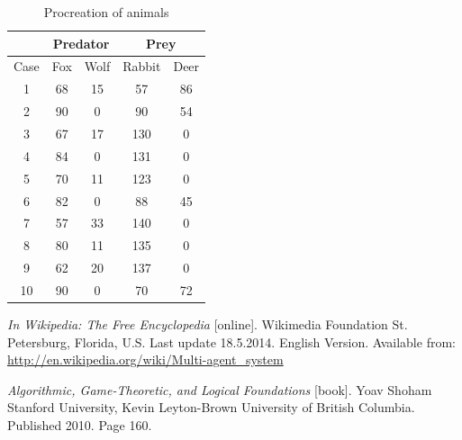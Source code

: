 \documentclass[11pt]{article}
\begin{document}
{	
	
	\begin{table}[p]
	\centering
	\begin{tabular}{| c | c | c || c | c |}
	\hline
	&\multicolumn{2}{|c||}{Predator} & \multicolumn{2}{c|}{Prey} \\
	\hline
	Case & Fox & Wolf & Rabbit & Deer \\
	\hline
	1 & 68 & 15 & 57 & 86 \\
	\hline
	2 & 90 & 0 & 90 & 54 \\
	\hline
	3 & 67 & 17 & 130 & 0 \\
	\hline
	4 & 84 & 0 & 131 & 0 \\
	\hline
	5 & 70 & 11 & 123 & 0 \\
	\hline
	6 & 82 & 0 & 88 & 45 \\
	\hline
	7 & 57 & 33 & 140 & 0 \\
	\hline
	8 & 80 & 11 & 135 & 0 \\
	\hline
	9 & 62 & 20 & 137 & 0 \\
	\hline
	10 & 90 & 0 & 70 & 72 \\
	\hline
	\end{tabular}
	\caption{Procreation of animals}
	\label{tab:procreationTable}
	
	\end{table}
}
\newpage

\begin{thebibliography}{9}

\emph{In Wikipedia: The Free Encyclopedia} [online]. Wikimedia Foundation St. Petersburg, Florida, U.S. Last update 18.5.2014. English Version. Available from: \url{http://en.wikipedia.org/wiki/Multi-agent_system}

\emph{Algorithmic, Game-Theoretic,
and Logical Foundations} [book]. Yoav Shoham Stanford University, Kevin Leyton-Brown University of British Columbia. Published 2010. Page 160. 

\end{thebibliography}
\end{document}
